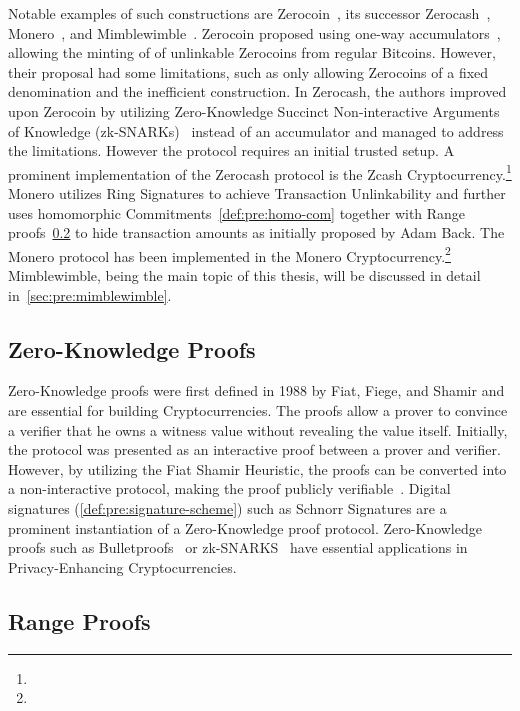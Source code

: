 Notable examples of such constructions are Zerocoin~\cite{miers2013zerocoin}, its successor Zerocash~\cite{sasson2014zerocash}, Monero~\cite{noether2015ring}, and Mimblewimble~\cite{jedusor2016mimblewimble}.
Zerocoin proposed using one-way accumulators~\cite{benaloh1993one}, allowing the minting of of unlinkable Zerocoins from regular Bitcoins.
However, their proposal had some limitations, such as only allowing Zerocoins of a fixed denomination and the inefficient construction.
In Zerocash, the authors improved upon Zerocoin by utilizing Zero-Knowledge Succinct Non-interactive Arguments of Knowledge (zk-SNARKs)~\cite{bitansky2012extractable} instead of an accumulator and managed to address the limitations.
However the protocol requires an initial trusted setup.
A prominent implementation of the Zerocash protocol is the Zcash Cryptocurrency.\footnote{\urlzcash}
Monero utilizes Ring Signatures to achieve Transaction Unlinkability and further uses homomorphic Commitments~\cref{def:pre:homo-com} together with Range proofs~\cref{sec:pre:rangeproof} to hide transaction amounts as initially proposed by Adam Back.
The Monero protocol has been implemented in the Monero Cryptocurrency.\footnote{\urlmonero}
Mimblewimble, being the main topic of this thesis, will be discussed in detail in~\cref{sec:pre:mimblewimble}.

\subsection{Zero-Knowledge Proofs} \label{sec:pre:privacy:zeroknowlegde}

Zero-Knowledge proofs were first defined in 1988 by Fiat, Fiege, and Shamir and are essential for building Cryptocurrencies.
The proofs allow a prover to convince a verifier that he owns a witness value without revealing the value itself.
Initially, the protocol was presented as an interactive proof between a prover and verifier.
However, by utilizing the Fiat Shamir Heuristic, the proofs can be converted into a non-interactive protocol, making the proof publicly verifiable~\cite{feige1988zero}.
Digital signatures (\cref{def:pre:signature-scheme}) such as Schnorr Signatures are a prominent instantiation of a Zero-Knowledge proof protocol.
Zero-Knowledge proofs such as Bulletproofs~\cite{bunz2018bulletproofs} or zk-SNARKS~\cite{bitansky2012extractable} have essential applications in Privacy-Enhancing Cryptocurrencies.

\subsection{Range Proofs} \label{sec:pre:rangeproof}

